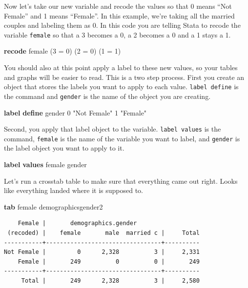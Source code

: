 \documentclass[
]{book}
\newenvironment{Shaded}{\begin{snugshade}}{\end{snugshade}}
\newcommand{\KeywordTok}[1]{\textcolor[rgb]{0.13,0.29,0.53}{\textbf{#1}}}
\newcommand{\NormalTok}[1]{#1}
\newcommand{\StringTok}[1]{\textcolor[rgb]{0.31,0.60,0.02}{#1}}
\begin{document}
Now let's take our new variable and recode the values so that 0 means ``Not Female'' and 1 means ``Female''. In this example, we're taking all the married couples and labeling them as 0. In this code you are telling Stata to recode the variable \texttt{female} so that a 3 becomes a 0, a 2 becomes a 0 and a 1 stays a 1.

\begin{Shaded}
\begin{Highlighting}[]
\KeywordTok{recode}\NormalTok{ female (3 = 0) (2 = 0) (1 = 1) }
\end{Highlighting}
\end{Shaded}

You should also at this point apply a label to these new values, so your tables and graphs will be easier to read. This is a two step process. First you create an object that stores the labels you want to apply to each value. \texttt{label\ define} is the command and \texttt{gender} is the name of the object you are creating.

\begin{Shaded}
\begin{Highlighting}[]
\KeywordTok{label} \KeywordTok{define}\NormalTok{ gender 0 }\StringTok{"Not Female"}\NormalTok{ 1 }\StringTok{"Female"}
\end{Highlighting}
\end{Shaded}

Second, you apply that label object to the variable. \texttt{label\ values} is the command, \texttt{female} is the name of the variable you want to label, and \texttt{gender} is the label object you want to apply to it.

\begin{Shaded}
\begin{Highlighting}[]
\KeywordTok{label} \KeywordTok{values}\NormalTok{ female gender}
\end{Highlighting}
\end{Shaded}

Let's run a crosstab table to make sure that everything came out right. Looks like everything landed where it is supposed to.

\begin{Shaded}
\begin{Highlighting}[]
\KeywordTok{tab}\NormalTok{ female demographicsgender2}
\end{Highlighting}
\end{Shaded}

\begin{verbatim}
    Female |       demographics.gender
 (recoded) |    female       male  married c |     Total
-----------+---------------------------------+----------
Not Female |         0      2,328          3 |     2,331 
    Female |       249          0          0 |       249 
-----------+---------------------------------+----------
     Total |       249      2,328          3 |     2,580 
\end{verbatim}
\end{document}
